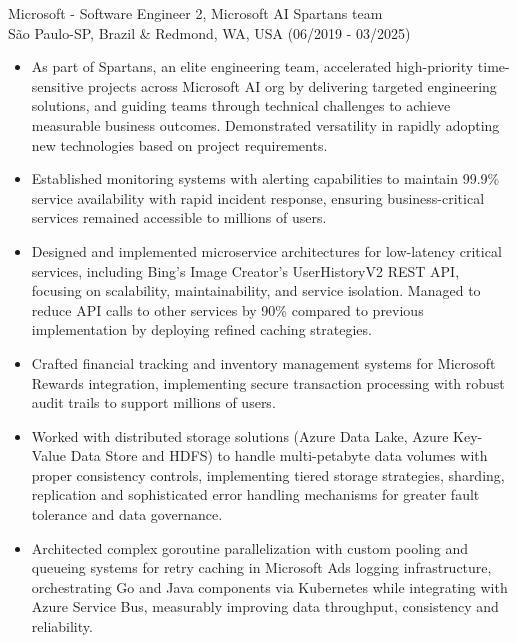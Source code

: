 
\normalsize{Microsoft - Software Engineer 2, Microsoft AI Spartans team}\\
        \scriptsize{São Paulo-SP, Brazil \& Redmond, WA, USA (06/2019 - 03/2025)}
\begin{itemize}
    \item \scriptsize{As part of Spartans, an elite engineering team, accelerated high-priority
        time-sensitive projects across Microsoft AI org by delivering targeted engineering solutions,
        and guiding teams through technical challenges to achieve measurable business outcomes.
        Demonstrated versatility in rapidly adopting new technologies based on project requirements.}

    \item \scriptsize{Established monitoring systems with alerting capabilities to maintain 99.9\%
        service availability with rapid incident response, ensuring business-critical services remained 
        accessible to millions of users.}

    \item \scriptsize{Designed and implemented microservice architectures for low-latency critical
        services, including Bing's Image Creator's UserHistoryV2 REST API, focusing on scalability,
        maintainability, and service isolation. Managed to reduce API calls to other services by 90\%
        compared to previous implementation by deploying refined caching strategies.}

    \item \scriptsize{Crafted financial tracking and inventory management systems for Microsoft Rewards
        integration, implementing secure transaction processing with robust audit trails to support
        millions of users.}

    \item \scriptsize{Worked with distributed storage solutions (Azure Data Lake, Azure Key-Value Data
        Store and HDFS) to handle multi-petabyte data volumes with proper consistency controls,
        implementing tiered storage strategies, sharding, replication and sophisticated error handling
        mechanisms for greater fault tolerance and data governance.}

    \item \scriptsize{Architected complex goroutine parallelization with custom pooling and queueing
        systems for retry caching in Microsoft Ads logging infrastructure, orchestrating Go and Java
        components via Kubernetes while integrating with Azure Service Bus, measurably improving data
        throughput, consistency and reliability.}


\end{itemize}

